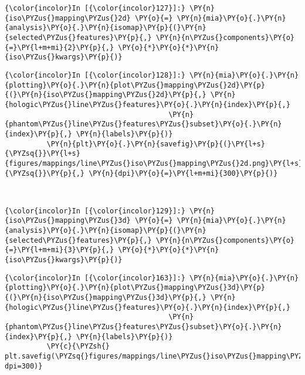     \begin{Verbatim}[commandchars=\\\{\}]
{\color{incolor}In [{\color{incolor}127}]:} \PY{n}{iso\PYZus{}mapping\PYZus{}2d} \PY{o}{=} \PY{n}{mia}\PY{o}{.}\PY{n}{analysis}\PY{o}{.}\PY{n}{isomap}\PY{p}{(}\PY{n}{selected\PYZus{}features}\PY{p}{,} \PY{n}{n\PYZus{}components}\PY{o}{=}\PY{l+m+mi}{2}\PY{p}{,} \PY{o}{*}\PY{o}{*}\PY{n}{iso\PYZus{}kwargs}\PY{p}{)}
\end{Verbatim}

    \begin{Verbatim}[commandchars=\\\{\}]
{\color{incolor}In [{\color{incolor}128}]:} \PY{n}{mia}\PY{o}{.}\PY{n}{plotting}\PY{o}{.}\PY{n}{plot\PYZus{}mapping\PYZus{}2d}\PY{p}{(}\PY{n}{iso\PYZus{}mapping\PYZus{}2d}\PY{p}{,} \PY{n}{hologic\PYZus{}line\PYZus{}features}\PY{o}{.}\PY{n}{index}\PY{p}{,}
                                       \PY{n}{phantom\PYZus{}line\PYZus{}features\PYZus{}subset}\PY{o}{.}\PY{n}{index}\PY{p}{,} \PY{n}{labels}\PY{p}{)}
          \PY{n}{plt}\PY{o}{.}\PY{n}{savefig}\PY{p}{(}\PY{l+s}{\PYZsq{}}\PY{l+s}{figures/mappings/line\PYZus{}iso\PYZus{}mapping\PYZus{}2d.png}\PY{l+s}{\PYZsq{}}\PY{p}{,} \PY{n}{dpi}\PY{o}{=}\PY{l+m+mi}{300}\PY{p}{)}
\end{Verbatim}

    \begin{center}
    \end{center}
    { \hspace*{\fill} \\}

    \begin{Verbatim}[commandchars=\\\{\}]
{\color{incolor}In [{\color{incolor}129}]:} \PY{n}{iso\PYZus{}mapping\PYZus{}3d} \PY{o}{=} \PY{n}{mia}\PY{o}{.}\PY{n}{analysis}\PY{o}{.}\PY{n}{isomap}\PY{p}{(}\PY{n}{selected\PYZus{}features}\PY{p}{,} \PY{n}{n\PYZus{}components}\PY{o}{=}\PY{l+m+mi}{3}\PY{p}{,} \PY{o}{*}\PY{o}{*}\PY{n}{iso\PYZus{}kwargs}\PY{p}{)}
\end{Verbatim}

    \begin{Verbatim}[commandchars=\\\{\}]
{\color{incolor}In [{\color{incolor}163}]:} \PY{n}{mia}\PY{o}{.}\PY{n}{plotting}\PY{o}{.}\PY{n}{plot\PYZus{}mapping\PYZus{}3d}\PY{p}{(}\PY{n}{iso\PYZus{}mapping\PYZus{}3d}\PY{p}{,} \PY{n}{hologic\PYZus{}line\PYZus{}features}\PY{o}{.}\PY{n}{index}\PY{p}{,}
                                       \PY{n}{phantom\PYZus{}line\PYZus{}features\PYZus{}subset}\PY{o}{.}\PY{n}{index}\PY{p}{,} \PY{n}{labels}\PY{p}{)}
          \PY{c}{\PYZsh{} plt.savefig(\PYZsq{}figures/mappings/line\PYZus{}iso\PYZus{}mapping\PYZus{}3d.png\PYZsq{}, dpi=300)}
\end{Verbatim}

